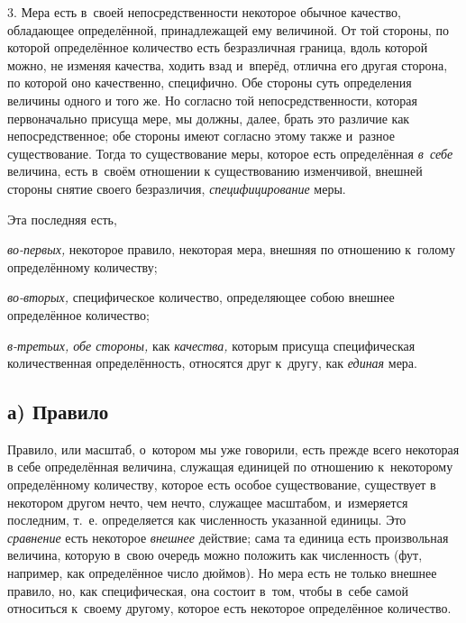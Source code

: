 3. Мера есть в~своей непосредственности некоторое обычное качество, обладающее
определённой, принадлежащей ему величиной. От той стороны, по которой
определённое количество есть безразличная граница, вдоль которой можно, не
изменяя качества, ходить взад и~вперёд, отлична его другая сторона, по которой
оно качественно, специфично. Обе стороны суть определения величины одного и
того же. Но согласно той непосредственности, которая первоначально присуща
мере, мы должны, далее, брать это различие как непосредственное; обе стороны
имеют согласно этому также и~разное существование. Тогда то существование меры,
которое есть определённая {\em в~себе} величина, есть в~своём отношении к
существованию изменчивой, внешней стороны снятие своего безразличия,
{\em специфицирование} меры.


Эта последняя есть,

{\em во-первых,} некоторое правило, некоторая мера, внешняя
по отношению к~голому определённому количеству;

{\em во-вторых,} специфическое количество, определяющее собою внешнее
определённое количество;

{\em в-третьих, обе стороны,} как {\em качества,} которым присуща
специфическая количественная определённость, относятся друг к~другу, как
{\em единая} мера.

\subsection[а) Правило]{а) Правило}

Правило, или масштаб, о~котором мы уже говорили, есть прежде всего некоторая в
себе определённая величина, служащая единицей по отношению к~некоторому
определённому количеству, которое есть особое существование, существует в
некотором другом нечто, чем нечто, служащее масштабом, и~измеряется последним,
т.~е. определяется как численность указанной единицы. Это {\em сравнение} есть
некоторое {\em внешнее} действие; сама та единица есть произвольная величина, которую
в~свою очередь можно положить как численность (фут, например, как определённое
число дюймов). Но мера есть не только внешнее правило, но, как специфическая,
она состоит в~том, чтобы в~себе самой относиться к~своему другому, которое есть
некоторое определённое количество.

